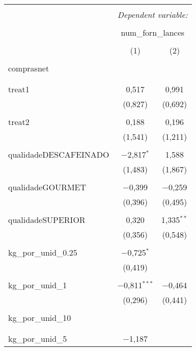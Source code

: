 
\begin{table}[!htbp] \centering 
  \caption{} 
  \label{} 
\begin{tabular}{@{\extracolsep{5pt}}lcc} 
\\[-1.8ex]\hline 
\hline \\[-1.8ex] 
 & \multicolumn{2}{c}{\textit{Dependent variable:}} \\ 
\cline{2-3} 
\\[-1.8ex] & \multicolumn{2}{c}{num\_forn\_lances} \\ 
\\[-1.8ex] & (1) & (2)\\ 
\hline \\[-1.8ex] 
 comprasnet &  &  \\ 
  &  &  \\ 
  & & \\ 
 treat1 & 0,517 & 0,991 \\ 
  & (0,827) & (0,692) \\ 
  & & \\ 
 treat2 & 0,188 & 0,196 \\ 
  & (1,541) & (1,211) \\ 
  & & \\ 
 qualidadeDESCAFEINADO & $-$2,817$^{*}$ & 1,588 \\ 
  & (1,483) & (1,867) \\ 
  & & \\ 
 qualidadeGOURMET & $-$0,399 & $-$0,259 \\ 
  & (0,396) & (0,495) \\ 
  & & \\ 
 qualidadeSUPERIOR & 0,320 & 1,335$^{**}$ \\ 
  & (0,356) & (0,548) \\ 
  & & \\ 
 kg\_por\_unid\_0.25 & $-$0,725$^{*}$ &  \\ 
  & (0,419) &  \\ 
  & & \\ 
 kg\_por\_unid\_1 & $-$0,811$^{***}$ & $-$0,464 \\ 
  & (0,296) & (0,441) \\ 
  & & \\ 
 kg\_por\_unid\_10 &  &  \\ 
  &  &  \\ 
  & & \\ 
 kg\_por\_unid\_5 & $-$1,187 &  \\ 

\end{tabular}
\end{table}

